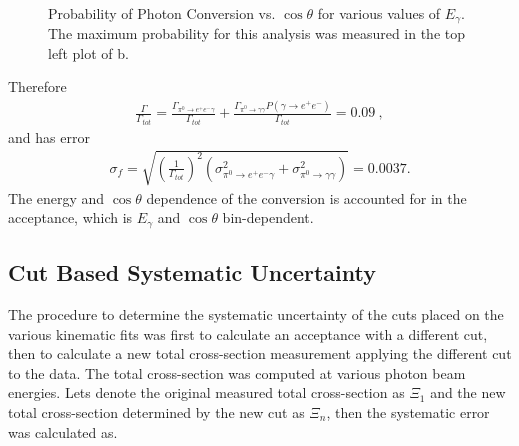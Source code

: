 \begin{figure}[h!]\begin{center}
\\
\caption[Probability of Photon Conversion vs. $\cos\theta$ for various values of $E_\gamma$]{\label{fig:convprob_all}Probability of Photon Conversion vs. $\cos\theta$ for various values of $E_\gamma$. The maximum probability for this analysis was measured in the top left plot of b.}
\end{center}\end{figure}
Therefore
\begin{align}
 \frac{\Gamma}{\Gamma_{tot}} = \frac{\Gamma_{\pi^{0}\rightarrow e^{+}e^{-}\gamma}}{\Gamma_{tot}} + \frac{\Gamma_{\pi^{0}\rightarrow \gamma \gamma}P(\gamma \to  e^{+}e^{-})}{\Gamma_{tot}} = 0.09 \ ,
\end{align}
and has error
\begin{align}
\sigma_f = \sqrt{\left(\frac{1}{\Gamma_{tot}}\right)^2(\sigma^2_{\pi^{0}\rightarrow e^{+}e^{-}\gamma} + \sigma^2_{\pi^{0}\rightarrow \gamma \gamma})  } = 0.0037.  
\end{align}
The energy and $\cos \theta$ dependence of the conversion is accounted for in the acceptance, which is $E_\gamma$ and $\cos \theta$ bin-dependent. 


\FloatBarrier

\subsection{Cut Based Systematic Uncertainty}
The procedure to determine the systematic uncertainty of the cuts placed on the various kinematic fits was first to calculate an acceptance with a different cut, then to calculate a new total cross-section measurement applying the different cut to the data. The total cross-section was computed at various photon beam energies. Lets denote the original measured total cross-section as $\Xi_1$ and the new total cross-section determined by the new cut as $\Xi_n$, then the systematic error was calculated as.

